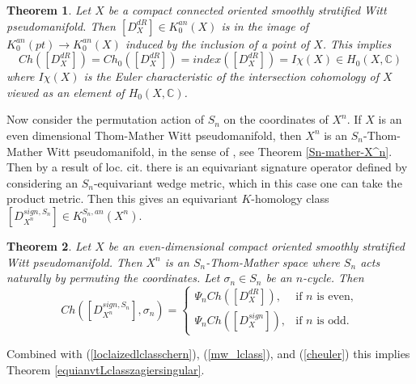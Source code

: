 \documentclass[11pt,leqno,twoside]{amsart}
\theoremstyle{plainsl}
\newtheorem{theorem}{Theorem}[section]
\theoremstyle{definition}
\newcommand{\C}{\mathbb{C}}
\begin{document}
  \begin{theorem}\cite{A2}\label{maintheorem} 
    Let $X$ be a compact connected  oriented smoothly stratified Witt pseudomanifold. Then
    $[D^{dR}_X]\in K^{an}_0(X)$ is in the image of $ K^{an}_0(pt)\rightarrow K^{an}_0(X)$ induced by the inclusion of a  point of $X$. This implies
    \begin{equation}\label{cheuler}
Ch([D^{dR}_X])=Ch_0([D^{dR}_X])=index([D^{dR}_X])=I\chi(X) \in H_0(X,\mathbb{C})
    \end{equation}
    where   $I\chi(X)$ is the Euler characteristic of the intersection cohomology of $X$ viewed as an element of $H_0(X,\C)$.
\end{theorem}




 






Now consider the permutation action of $S_n$ on the coordinates of $X^n$.  If $X$ is an even dimensional Thom-Mather Witt pseudomanifold, then $X^n$ is an $S_n$-Thom-Mather Witt pseudomanifold, in the sense of \cite{BLP}, see Theorem \ref{Sn-mather-X^n}. Then by a result of loc. cit. there is an equivariant signature operator defined by considering an $S_n$-equivariant wedge metric, which in this case one can take the product metric.  Then this gives an equivariant $K$-homology class $\left[D^{sign,S_n}_{X^n}\right]\in K_0^{S_n,an}(X^n)$.





\begin{theorem}\label{ch_sign_x^n-zagier}  Let $X$ be an even-dimensional compact  oriented  smoothly stratified Witt pseudomanifold.   Then $X^n$ is an $S_n$-Thom-Mather space where  $S_n$ acts naturally by permuting the coordinates. Let $\sigma_n\in S_n$ be an $n$-cycle. Then
\[
Ch(\left[D^{sign,S_n}_{X^n}\right],\sigma_n)
=
\begin{cases}
\Psi_nCh([D^{dR}_X]), & \text{if } n \text{ is even},\\[4pt]
\Psi_nCh([D^{sign}_X]), & \text{if } n \text{ is odd}.
\end{cases}
\]
\end{theorem}
 Combined with (\ref{loclaizedlclasschern}), (\ref{mw_lclass}), and (\ref{cheuler}) this implies Theorem \ref{equianvtLclasszagiersingular}.
 
\end{document}
